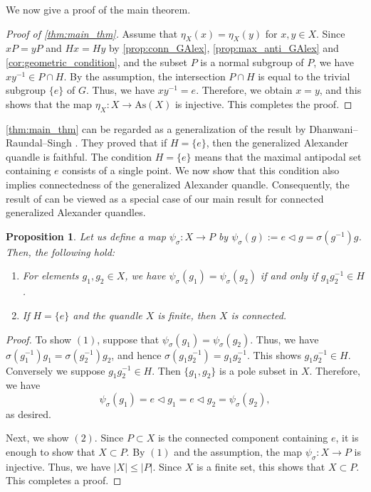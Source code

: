 \documentclass[dvipdfmx,12pt]{amsart}
\theoremstyle{plain}
\newtheorem{prop}[thm]{Proposition}
\theoremstyle{definition}
\newcommand{\As}{\mathrm{As}}
\newcommand{\qop}{\triangleleft}
\begin{document}
We now give a proof of the main theorem.
\begin{proof}[Proof of \cref{thm:main_thm}]
  Assume that $\eta_X(x) = \eta_X(y)$ for $x, y \in X$.
  Since $xP = yP$ and $Hx = Hy$ by \cref{prop:conn_GAlex}, \cref{prop:max_anti_GAlex} and \cref{cor:geometric_condition}, and the subset $P$ is a normal subgroup of $P$,
  we have $xy^{-1} \in P \cap H$.
  By the assumption, the intersection $P \cap H$ is equal to the trivial subgroup $\{e\}$ of $G$.
  Thus, we have $xy^{-1} = e$.
  Therefore, we obtain $x = y$, and this shows that the map $\eta_X: X \to \As(X)$ is injective.
  This completes the proof.
\end{proof}


\cref{thm:main_thm} can be regarded as a generalization of the result by Dhanwani--Raundal--Singh \cite{Dhanwani-2023-DehnQuandlesGroupsOrientable}.
They proved that if $H = \{e\}$, then the generalized Alexander quandle is faithful.
The condition $H = \{e\}$ means that the maximal antipodal set containing $e$ consists of a single point.
We now show that this condition also implies connectedness of the generalized Alexander quandle.
Consequently, the result of \cite{Dhanwani-2023-DehnQuandlesGroupsOrientable} can be viewed as a special case of our main result for connected generalized Alexander quandles.


\begin{prop}
  Let us define a map $\psi_\sigma: X \to P$ by $\psi_\sigma(g) := e \qop g = \sigma(g^{-1})g$.
  Then, the following hold:
  \begin{enumerate}
      \item[$(1)$] For elements $g_1, g_2 \in X$, we have $\psi_\sigma(g_1) = \psi_\sigma(g_2)$ if and only if $g_1 g_2^{-1} \in H$. 
      \item[$(2)$] If $H = \{e\}$ and the quandle $X$ is finite, then $X$ is connected.
  \end{enumerate}
\end{prop}

\begin{proof}
    To show $(1)$, suppose that $\psi_\sigma(g_1) = \psi_\sigma(g_2)$.
    Thus, we have $\sigma(g_1^{-1})g_1 = \sigma(g_2^{-1})g_2$, and hence $\sigma(g_1g_2^{-1}) = g_1g_2^{-1}$.
    This shows $g_1g_2^{-1} \in H$.
    Conversely we suppose $g_1g_2^{-1} \in H$. 
    Then $\{g_1, g_2\}$ is a pole subset in $X$.
    Therefore, we have
    \[
        \psi_\sigma(g_1) = e \qop g_1 = e \qop g_2 = \psi_\sigma(g_2),
    \]
    as desired.

    Next, we show $(2)$.
    Since $P \subset X$ is the connected component containing $e$, it is enough to show that $X \subset P$.
    By $(1)$ and the assumption, the map $\psi_\sigma: X \to P$ is injective.
    Thus, we have $|X| \leq |P|$.
    Since $X$ is a finite set, this shows that $X \subset P$.
    This completes a proof.
\end{proof}
\end{document}
